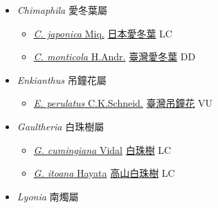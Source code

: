 
  \begin{itemize}
 \item[] \textit{Chimaphila} 愛冬葉屬
                    
  \begin{itemize}
        \item[] \href{http://www.theplantlist.org/tpl1.1/search?q=Chimaphila+japonica}{\textit{C. japonica} Miq.}   \href{\detokenize{http://taibnet.sinica.edu.tw/chi/taibnet_species_list.php?T2=日本愛冬葉&T2_new_value=true&fr=y}}{日本愛冬葉} LC
        \item[] \href{http://www.theplantlist.org/tpl1.1/search?q=Chimaphila+monticola}{\textit{C. monticola} H.Andr.}   \href{\detokenize{http://taibnet.sinica.edu.tw/chi/taibnet_species_list.php?T2=臺灣愛冬葉&T2_new_value=true&fr=y}}{臺灣愛冬葉} DD
  \end{itemize}
 \item[] \textit{Enkianthus} 吊鐘花屬
                    
  \begin{itemize}
        \item[] \href{http://www.theplantlist.org/tpl1.1/search?q=Enkianthus+perulatus}{\textit{E. perulatus} C.K.Schneid.}   \href{\detokenize{http://taibnet.sinica.edu.tw/chi/taibnet_species_list.php?T2=臺灣吊鐘花&T2_new_value=true&fr=y}}{臺灣吊鐘花} VU
  \end{itemize}
 \item[] \textit{Gaultheria} 白珠樹屬
                    
  \begin{itemize}
        \item[] \href{http://www.theplantlist.org/tpl1.1/search?q=Gaultheria+cumingiana}{\textit{G. cumingiana} Vidal}   \href{\detokenize{http://taibnet.sinica.edu.tw/chi/taibnet_species_list.php?T2=白珠樹&T2_new_value=true&fr=y}}{白珠樹} LC
        \item[] \href{http://www.theplantlist.org/tpl1.1/search?q=Gaultheria+itoana}{\textit{G. itoana} Hayata}   \href{\detokenize{http://taibnet.sinica.edu.tw/chi/taibnet_species_list.php?T2=高山白珠樹&T2_new_value=true&fr=y}}{高山白珠樹} LC
  \end{itemize}
 \item[] \textit{Lyonia} 南燭屬
                    

\end{itemize}

